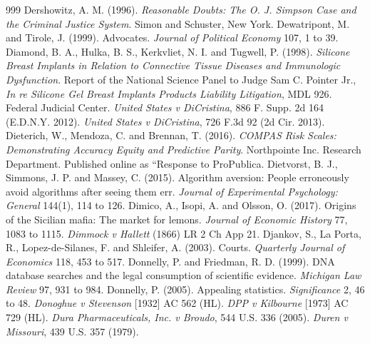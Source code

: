 \begin{thebibliography}{999}
 Dershowitz, A. M. (1996). \emph{Reasonable Doubts: The O. J. Simpson Case and the Criminal Justice System}. Simon and Schuster, New York.
 Dewatripont, M. and Tirole, J. (1999). Advocates. \emph{Journal of Political Economy} 107, 1 to 39.
 Diamond, B. A., Hulka, B. S., Kerkvliet, N. I. and Tugwell, P. (1998). \emph{Silicone Breast Implants in Relation to Connective Tissue Diseases and Immunologic Dysfunction}. Report of the National Science Panel to Judge Sam C. Pointer Jr., \emph{In re Silicone Gel Breast Implants Products Liability Litigation}, MDL 926. Federal Judicial Center.
 \emph{United States v DiCristina}, 886 F. Supp. 2d 164 (E.D.N.Y. 2012).
 \emph{United States v DiCristina}, 726 F.3d 92 (2d Cir. 2013).
 Dieterich, W., Mendoza, C. and Brennan, T. (2016). \emph{COMPAS Risk Scales: Demonstrating Accuracy Equity and Predictive Parity}. Northpointe Inc. Research Department. Published online as ``Response to ProPublica.
 Dietvorst, B. J., Simmons, J. P. and Massey, C. (2015). Algorithm aversion: People erroneously avoid algorithms after seeing them err. \emph{Journal of Experimental Psychology: General} 144(1), 114 to 126.
 Dimico, A., Isopi, A. and Olsson, O. (2017). Origins of the Sicilian mafia: The market for lemons. \emph{Journal of Economic History} 77, 1083 to 1115.
 \emph{Dimmock v Hallett} (1866) LR 2 Ch App 21.
 Djankov, S., La Porta, R., Lopez-de-Silanes, F. and Shleifer, A. (2003). Courts. \emph{Quarterly Journal of Economics} 118, 453 to 517.
 Donnelly, P. and Friedman, R. D. (1999). DNA database searches and the legal consumption of scientific evidence. \emph{Michigan Law Review} 97, 931 to 984.
 Donnelly, P. (2005). Appealing statistics. \emph{Significance} 2, 46 to 48.
 \emph{Donoghue v Stevenson} [1932] AC 562 (HL).
 \emph{DPP v Kilbourne} [1973] AC 729 (HL).
 \emph{Dura Pharmaceuticals, Inc. v Broudo}, 544 U.S. 336 (2005).
 \emph{Duren v Missouri}, 439 U.S. 357 (1979).

\end{thebibliography}
